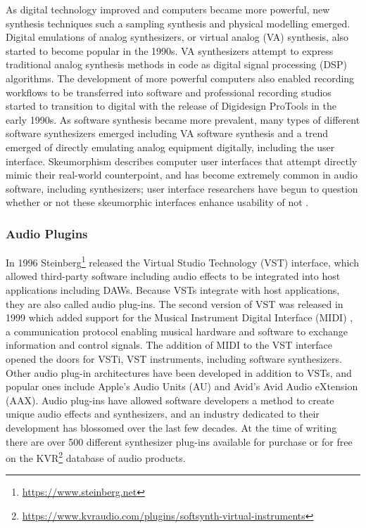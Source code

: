 As digital technology improved and computers became more powerful, new synthesis techniques such a sampling synthesis \cite{mcguire2015musical} and physical modelling \cite{jaffe1983extensions} emerged. Digital emulations of analog synthesizers, or virtual analog (VA) synthesis, also started to become popular in the 1990s. VA synthesizers attempt to express traditional analog synthesis methods in code as digital signal processing (DSP) algorithms. The development of more powerful computers also enabled recording workflows to be transferred into software and professional recording studios started to transition to digital with the release of Digidesign ProTools in the early 1990s. As software synthesis became more prevalent, many types of different software synthesizers emerged including VA software synthesis and a trend emerged of directly emulating analog equipment digitally, including the user interface. Skeumorphism describes computer user interfaces that attempt directly mimic their real-world counterpoint, and has become extremely common in audio software, including synthesizers; user interface researchers have begun to question whether or not these skeumorphic interfaces enhance usability of not \cite{lindh2018beyond}.

\subsubsection{Audio Plugins}
In 1996 Steinberg\footnote{\url{https://www.steinberg.net}} released the Virtual Studio Technology (VST) interface, which allowed third-party software including audio effects to be integrated into host applications including DAWs. Because VSTs integrate with host applications, they are also called audio plug-ins. The second version of VST was released in 1999 which added support for the Musical Instrument Digital Interface (MIDI) \cite{rothstein1992midi}, a communication protocol enabling musical hardware and software to exchange information and control signals. The addition of MIDI to the VST interface opened the doors for VSTi, VST instruments, including software synthesizers. Other audio plug-in architectures have been developed in addition to VSTs, and popular ones include Apple's Audio Units (AU) and Avid's Avid Audio eXtension (AAX). Audio plug-ins have allowed software developers a method to create unique audio effects and synthesizers, and an industry dedicated to their development has blossomed over the last few decades. At the time of writing there are over 500 different synthesizer plug-ins available for purchase or for free on the KVR\footnote{\url{https://www.kvraudio.com/plugins/softsynth-virtual-instruments}} database of audio products.

